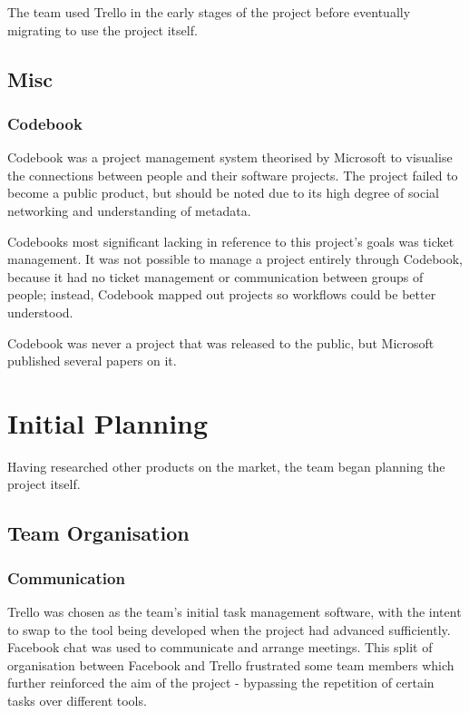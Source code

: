 \documentclass[a4paper]{l3proj}
\begin{document}
The team used Trello in the early stages of the project before eventually migrating to use the project itself.

\section{Misc}

\subsection{Codebook}
\label{codebook}
Codebook was a project management system theorised by Microsoft to visualise the connections between people and their software projects. The project failed to become a public product, but should be noted due to its high degree of social networking and understanding of metadata.

Codebooks most significant lacking in reference to this project’s goals was ticket management. It was not possible to manage a project entirely through Codebook, because it had no ticket management or communication between groups of people; instead, Codebook mapped out projects so workflows could be better understood.

Codebook was never a project that was released to the public, but Microsoft published several papers on it.

\chapter{Initial Planning}
\label{initialPlanning}
Having researched other products on the market, the team began planning the project itself. 

\section{Team Organisation}
\label{organisation}

\subsection{Communication}
\label{communication}
Trello was chosen as the team's initial task management software, with the intent to swap to the tool being developed when the project had advanced sufficiently. Facebook chat was used to communicate and arrange meetings.  This split of organisation between Facebook and Trello frustrated some team members which further reinforced the aim of the project - bypassing the repetition of certain tasks over different tools.
\end{document}
